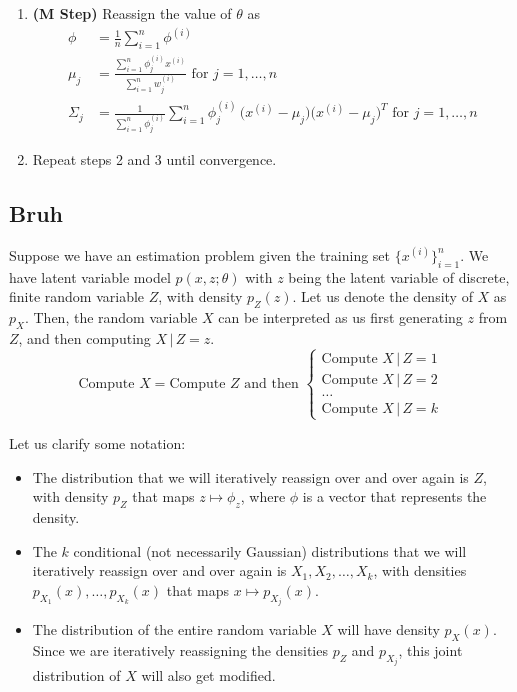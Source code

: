 \begin{definition}
\begin{enumerate}
      \item \textbf{(M Step)} Reassign the value of $\theta$ as 
      \begin{align*} 
        \phi & = \frac{1}{n} \sum_{i=1}^n \phi^{(i)} \\
        \mu_j & = \frac{\sum_{i=1}^n \phi_j^{(i)} x^{(i)}}{\sum_{i=1}^n w_j^{(i)}} \text{ for } j = 1, \ldots, n \\
        \Sigma_j & = \frac{1}{\sum_{i=1}^n \phi_j^{(i)}} \sum_{i=1}^n \phi^{(i)}_j \, \big(x^{(i)} - \mu_j \big) \big(x^{(i)} - \mu_j\big)^T \text{ for } j = 1, \ldots, n 
      \end{align*}
      \item Repeat steps 2 and 3 until convergence.
    \end{enumerate}
  \end{definition}

\subsection{Bruh}

  Suppose we have an estimation problem given the training set $\{x^{(i)}\}_{i=1}^n$. We have latent variable model $p(x, z; \theta)$ with $z$ being the latent variable of discrete, finite random variable $Z$, with density $p_Z (z)$. Let us denote the density of $X$ as $p_X$. Then, the random variable $X$ can be interpreted as us first generating $z$ from $Z$, and then computing $X\,|\,Z = z$.  
  \[\text{Compute } X = \text{Compute } Z \text{ and then } \begin{cases} 
  \text{Compute } X \,|\, Z = 1 \\
  \text{Compute } X \,|\, Z = 2 \\
  \ldots \\
  \text{Compute } X \,|\, Z = k
  \end{cases}\]

  Let us clarify some notation: 
  \begin{itemize}
    \item The distribution that we will iteratively reassign over and over again is $Z$, with density $p_Z$ that maps $z \mapsto \phi_z$, where $\phi$ is a vector that represents the density.
    \item The $k$ conditional (not necessarily Gaussian) distributions that we will iteratively reassign over and over again is $X_1, X_2, \ldots, X_k$, with densities $p_{X_1} (x), \ldots, p_{X_k} (x)$ that maps $x \mapsto p_{X_j} (x)$.
    \item The distribution of the entire random variable $X$ will have density $p_X (x)$. Since we are iteratively reassigning the densities $p_Z$ and $p_{X_j}$, this joint distribution of $X$ will also get modified.
  \end{itemize}

